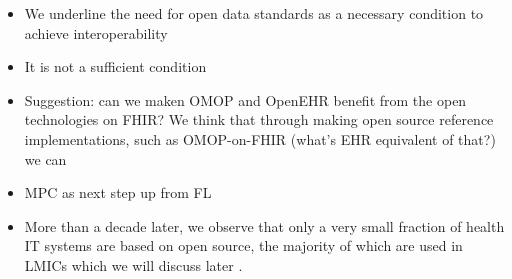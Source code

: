 \documentclass[
  authoryear]{elsarticle}
\providecommand{\tightlist}{%
  \setlength{\itemsep}{0pt}\setlength{\parskip}{0pt}}\usepackage{longtable,booktabs,array}
\begin{document}
\begin{itemize}
\tightlist
\item
  We underline the need for open data standards as a necessary condition
  to achieve interoperability
\item
  It is not a sufficient condition
\item
  Suggestion: can we maken OMOP and OpenEHR benefit from the open
  technologies on FHIR? We think that through making open source
  reference implementations, such as OMOP-on-FHIR (what's EHR equivalent
  of that?) we can
\item
  MPC as next step up from FL
\item
  More than a decade later, we observe that only a very small fraction
  of health IT systems are based on open source, the majority of which
  are used in LMICs which we will discuss later
  \citep{digitalpublicgoods}.
\end{itemize}


  
\end{document}
